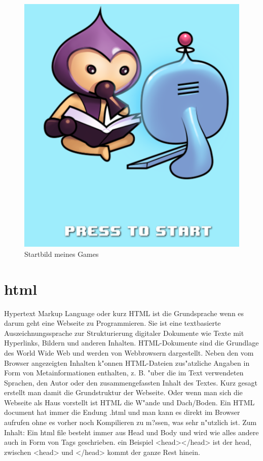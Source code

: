 \documentclass{article}
\begin{document}
\begin{figure}[ht]
    \centering
    \includegraphics[width=.7\linewidth]{foto}
    \caption{Startbild meines Games}
    \label{fig:sub1}
    \end{figure}

\cleardoublepage












\section{html}
Hypertext Markup Language oder kurz HTML ist die Grundsprache wenn es darum geht eine Webseite zu Programmieren.
 Sie ist eine textbasierte Auszeichnungssprache zur Strukturierung digitaler Dokumente wie Texte mit Hyperlinks, Bildern und anderen Inhalten.
 HTML-Dokumente sind die Grundlage des World Wide Web und werden von Webbrowsern dargestellt.
 Neben den vom Browser angezeigten Inhalten k"onnen HTML-Dateien zus"atzliche Angaben in Form von Metainformationen enthalten, z. B.
"uber die im Text verwendeten Sprachen, den Autor oder den zusammengefassten Inhalt des Textes.
Kurz gesagt erstellt man damit die Grundstruktur der Webseite.
Oder wenn man sich die Webseite als Haus vorstellt ist HTML die W"ande und Dach/Boden.
Ein HTML document hat immer die Endung .html und man kann es direkt im Browser aufrufen ohne es vorher noch Kompilieren zu m?ssen, was sehr n"utzlich ist.
Zum Inhalt:
Ein html file besteht immer aus Head und Body und wird wie alles andere auch in Form von Tags geschrieben.
ein Beispiel <head></head> ist der head, zwischen <head> und </head> kommt der ganze Rest hinein.
\end{document}
